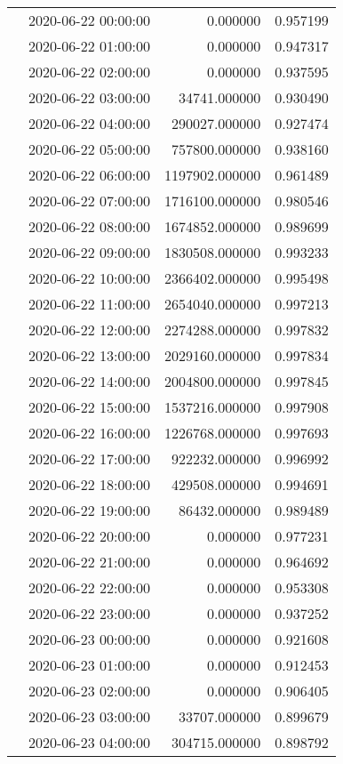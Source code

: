 \begin{tabular}{llrr}
 & 2020-06-22 00:00:00 & 0.000000 & 0.957199 \\
 & 2020-06-22 01:00:00 & 0.000000 & 0.947317 \\
 & 2020-06-22 02:00:00 & 0.000000 & 0.937595 \\
 & 2020-06-22 03:00:00 & 34741.000000 & 0.930490 \\
 & 2020-06-22 04:00:00 & 290027.000000 & 0.927474 \\
 & 2020-06-22 05:00:00 & 757800.000000 & 0.938160 \\
 & 2020-06-22 06:00:00 & 1197902.000000 & 0.961489 \\
 & 2020-06-22 07:00:00 & 1716100.000000 & 0.980546 \\
 & 2020-06-22 08:00:00 & 1674852.000000 & 0.989699 \\
 & 2020-06-22 09:00:00 & 1830508.000000 & 0.993233 \\
 & 2020-06-22 10:00:00 & 2366402.000000 & 0.995498 \\
 & 2020-06-22 11:00:00 & 2654040.000000 & 0.997213 \\
 & 2020-06-22 12:00:00 & 2274288.000000 & 0.997832 \\
 & 2020-06-22 13:00:00 & 2029160.000000 & 0.997834 \\
 & 2020-06-22 14:00:00 & 2004800.000000 & 0.997845 \\
 & 2020-06-22 15:00:00 & 1537216.000000 & 0.997908 \\
 & 2020-06-22 16:00:00 & 1226768.000000 & 0.997693 \\
 & 2020-06-22 17:00:00 & 922232.000000 & 0.996992 \\
 & 2020-06-22 18:00:00 & 429508.000000 & 0.994691 \\
 & 2020-06-22 19:00:00 & 86432.000000 & 0.989489 \\
 & 2020-06-22 20:00:00 & 0.000000 & 0.977231 \\
 & 2020-06-22 21:00:00 & 0.000000 & 0.964692 \\
 & 2020-06-22 22:00:00 & 0.000000 & 0.953308 \\
 & 2020-06-22 23:00:00 & 0.000000 & 0.937252 \\
 & 2020-06-23 00:00:00 & 0.000000 & 0.921608 \\
 & 2020-06-23 01:00:00 & 0.000000 & 0.912453 \\
 & 2020-06-23 02:00:00 & 0.000000 & 0.906405 \\
 & 2020-06-23 03:00:00 & 33707.000000 & 0.899679 \\
 & 2020-06-23 04:00:00 & 304715.000000 & 0.898792 \\

\end{tabular}
